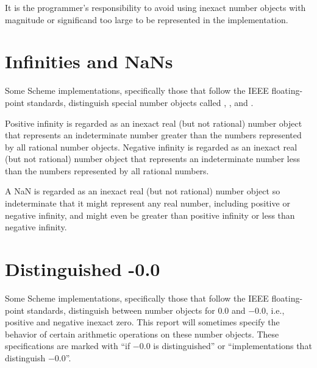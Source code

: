 It is the programmer's responsibility to avoid using inexact number
objects with magnitude or significand too large to be represented in
the implementation.

\section{Infinities and NaNs}

Some Scheme implementations, specifically those that follow the IEEE
floating-point standards, distinguish special number objects called
, , and .

Positive infinity is regarded as an inexact real (but not rational) number
object that represents an indeterminate number greater than the
numbers represented by all rational number objects.  Negative infinity
is regarded as an inexact real (but not rational) number object that represents
an indeterminate number less than the numbers represented by all
rational numbers.

A NaN is regarded as an inexact real (but not rational) number object so
indeterminate that it might represent any real number, including
positive or negative infinity, and might even be greater than positive
infinity or less than negative infinity.

\section{Distinguished -0.0}

Some Scheme implementations, specifically those that follow the IEEE
floating-point standards, distinguish between number objects for $0.0$
and $-0.0$, i.e., positive and negative inexact zero.  This report
will sometimes specify the behavior of certain arithmetic operations
on these number objects.  These specifications are marked with ``if
$-0.0$ is distinguished'' or ``implementations that distinguish
$-0.0$''.


